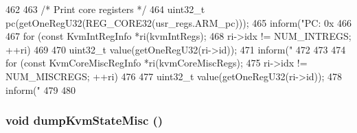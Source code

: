 \begin{DoxyCode}
462 {
463     /* Print core registers */
464     uint32_t pc(getOneRegU32(REG_CORE32(usr_regs.ARM_pc)));
465     inform("PC: 0x%
466 
467     for (const KvmIntRegInfo *ri(kvmIntRegs);
468          ri->idx != NUM_INTREGS; ++ri) {
469 
470         uint32_t value(getOneRegU32(ri->id));
471         inform("%
472     }
473 
474     for (const KvmCoreMiscRegInfo *ri(kvmCoreMiscRegs);
475          ri->idx != NUM_MISCREGS; ++ri) {
476 
477         uint32_t value(getOneRegU32(ri->id));
478         inform("%
479     }
480 }
\end{DoxyCode}
\hypertarget{classArmKvmCPU_a7e82213fbf8527640f993114c92f97eb}{
\subsubsection[{dumpKvmStateMisc}]{\setlength{\rightskip}{0pt plus 5cm}void dumpKvmStateMisc ()}}
\label{classArmKvmCPU_a7e82213fbf8527640f993114c92f97eb}



